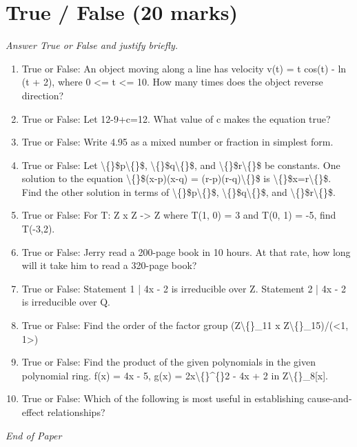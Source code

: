 \documentclass[12pt]{article}
\begin{document}
\section*{True / False (20 marks)}
\textit{Answer True or False and justify briefly.}
\begin{enumerate}[label=\arabic*.]
\item True or False: An object moving along a line has velocity v(t) = t cos(t) - ln (t + 2), where 0 <= t <= 10. How many times does the object reverse direction?
\item True or False: Let 12-9+c=12. What value of c makes the equation true?
\item True or False: Write 4.95 as a mixed number or fraction in simplest form.
\item True or False: Let \textbackslash\{\}\$p\textbackslash\{\}\$, \textbackslash\{\}\$q\textbackslash\{\}\$, and \textbackslash\{\}\$r\textbackslash\{\}\$ be constants. One solution to the equation \textbackslash\{\}\$(x-p)(x-q) = (r-p)(r-q)\textbackslash\{\}\$ is \textbackslash\{\}\$x=r\textbackslash\{\}\$. Find the other solution in terms of \textbackslash\{\}\$p\textbackslash\{\}\$, \textbackslash\{\}\$q\textbackslash\{\}\$, and \textbackslash\{\}\$r\textbackslash\{\}\$.
\item True or False: For T: Z x Z -> Z where T(1, 0) = 3 and T(0, 1) = -5, find T(-3,2).
\item True or False: Jerry read a 200-page book in 10 hours. At that rate, how long will it take him to read a 320-page book?
\item True or False: Statement 1 | 4x - 2 is irreducible over Z. Statement 2 | 4x - 2 is irreducible over Q.
\item True or False: Find the order of the factor group (Z\textbackslash\{\}\_11 x Z\textbackslash\{\}\_15)/(<1, 1>)
\item True or False: Find the product of the given polynomials in the given polynomial ring. f(x) = 4x - 5, g(x) = 2x\textbackslash\{\}\^{}\{\}2 - 4x + 2 in Z\textbackslash\{\}\_8[x].
\item True or False: Which of the following is most useful in establishing cause-and-effect relationships?
\end{enumerate}

\vfill
\noindent\textit{End of Paper}
\end{document}
